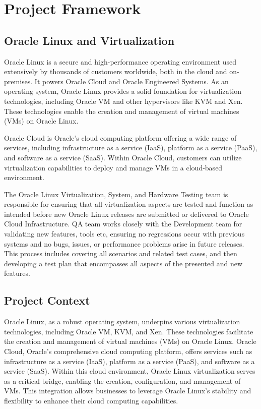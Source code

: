 \section{Project Framework}


\subsection{Oracle Linux and Virtualization}
Oracle Linux is a secure and high-performance operating environment used extensively by thousands of customers worldwide, both in the cloud and on-premises. It powers Oracle Cloud and Oracle Engineered Systems. As an operating system, Oracle Linux provides a solid foundation for virtualization technologies, including Oracle VM and other hypervisors like KVM and Xen. These technologies enable the creation and management of virtual machines (VMs) on Oracle Linux.\mynewline

Oracle Cloud is Oracle's cloud computing platform offering a wide range of services, including infrastructure as a service (IaaS), platform as a service (PaaS), and software as a service (SaaS). Within Oracle Cloud, customers can utilize virtualization capabilities to deploy and manage VMs in a cloud-based environment.\mynewline

The Oracle Linux Virtualization, System, and Hardware Testing team is responsible for ensuring that all virtualization aspects are tested and function as intended before new Oracle Linux releases are submitted or delivered to Oracle Cloud Infrastructure. QA team works closely with the Development team for validating new features, tools etc,  ensuring no regressions occur with previous systems and no bugs, issues, or performance problems arise in future releases. This process includes covering all scenarios and related test cases, and then developing a test plan that encompasses all aspects of the presented and new features.


\subsection{Project Context}
Oracle Linux, as a robust operating system, underpins various virtualization technologies, including Oracle VM, KVM, and Xen. These technologies facilitate the creation and management of virtual machines (VMs) on Oracle Linux. Oracle Cloud, Oracle’s comprehensive cloud computing platform, offers services such as infrastructure as a service (IaaS), platform as a service (PaaS), and software as a service (SaaS). Within this cloud environment, Oracle Linux virtualization serves as a critical bridge, enabling the creation, configuration, and management of VMs. This integration allows businesses to leverage Oracle Linux's stability and flexibility to enhance their cloud computing capabilities.


